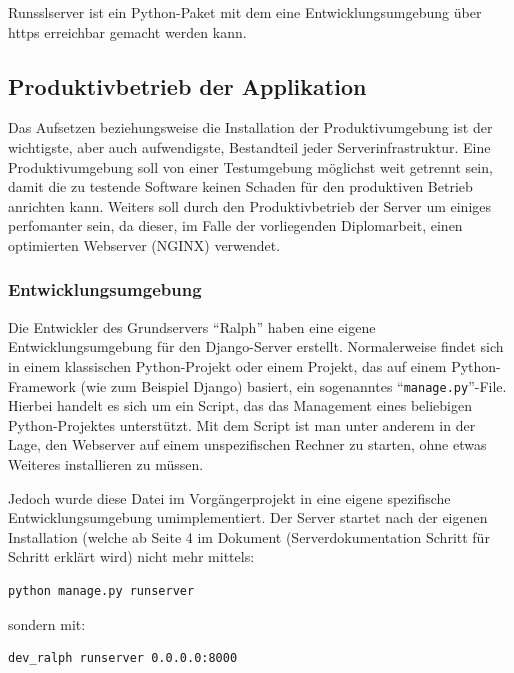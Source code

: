 \documentclass[
]{article}
\begin{document}
Runsslserver ist ein Python-Paket mit dem eine Entwicklungsumgebung über
https erreichbar gemacht werden kann.

\hypertarget{produktivbetrieb-der-applikation}{%
\subsection{Produktivbetrieb der
Applikation}\label{produktivbetrieb-der-applikation}}

Das Aufsetzen beziehungsweise die Installation der Produktivumgebung ist
der wichtigste, aber auch aufwendigste, Bestandteil jeder
Serverinfrastruktur. Eine Produktivumgebung soll von einer Testumgebung
möglichst weit getrennt sein, damit die zu testende Software keinen
Schaden für den produktiven Betrieb anrichten kann. Weiters soll durch
den Produktivbetrieb der Server um einiges perfomanter sein, da dieser,
im Falle der vorliegenden Diplomarbeit, einen optimierten Webserver
(NGINX) verwendet.

\hypertarget{entwicklungsumgebung}{%
\subsubsection{Entwicklungsumgebung}\label{entwicklungsumgebung}}

Die Entwickler des Grundservers ``Ralph'' haben eine eigene
Entwicklungsumgebung für den Django-Server erstellt. Normalerweise
findet sich in einem klassischen Python-Projekt oder einem Projekt, das
auf einem Python-Framework (wie zum Beispiel Django) basiert, ein
sogenanntes ``\texttt{manage.py}''-File. Hierbei handelt es sich um ein
Script, das das Management eines beliebigen Python-Projektes
unterstützt. Mit dem Script ist man unter anderem in der Lage, den
Webserver auf einem unspezifischen Rechner zu starten, ohne etwas
Weiteres installieren zu müssen.

Jedoch wurde diese Datei im Vorgängerprojekt in eine eigene spezifische
Entwicklungsumgebung umimplementiert. Der Server startet nach der
eigenen Installation (welche ab Seite 4 im Dokument (Serverdokumentation
Schritt für Schritt erklärt wird) nicht mehr mittels:

\begin{verbatim}
python manage.py runserver
\end{verbatim}

sondern mit:

\begin{verbatim}
dev_ralph runserver 0.0.0.0:8000
\end{verbatim}
\end{document}
